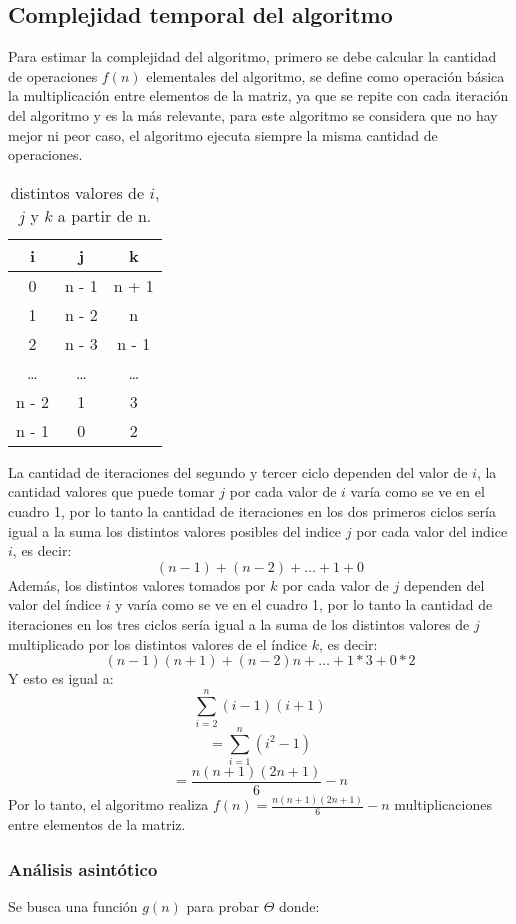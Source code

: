 \documentclass[11pt]{article}
\begin{document}
\subsection{Complejidad temporal del algoritmo}
Para estimar la complejidad del algoritmo, primero se debe calcular la cantidad de operaciones \(f(n)\) elementales del algoritmo, se define como operación básica la multiplicación entre elementos de la matriz, ya que se repite con cada iteración del algoritmo y es la más relevante, para este algoritmo se considera que no hay mejor ni peor caso, el algoritmo ejecuta siempre la misma cantidad de operaciones. 

\begin{table}[h!]
\centering
\begin{tabular}{||c c c||}
\hline 
\textbf{i}  &\textbf{j} & \textbf{k} \\[0.5ex] \hline\hline
0  & n - 1 & n + 1\\ \hline 
1  & n - 2 & n \\ \hline 
2 & n - 3 & n - 1 \\ \hline 
\dots  & \dots & \dots \\ \hline 
n - 2  &1 & 3 \\ \hline 
n - 1  &0 & 2 \\ \hline 
\end{tabular} 
\caption{distintos valores de \(i\),\(j\) y \(k\) a partir de n.}

\end{table}

La cantidad de iteraciones del segundo y tercer ciclo dependen del valor de \(i\), la cantidad valores que puede tomar \(j\) por cada valor de \(i\) varía como se ve en el cuadro 1, por lo tanto la cantidad de iteraciones en los dos primeros ciclos sería igual a la suma los distintos valores posibles del indice \(j\) por cada valor del indice \(i\), es decir: \[(n-1)+(n-2)+ \dots +1+0\]
Además, los distintos valores tomados por \(k\) por cada valor de \(j\) dependen del valor del índice \(i\) y varía como se ve en el cuadro 1, por lo tanto la cantidad de iteraciones en los tres ciclos sería igual a la suma de los distintos valores de \(j\) multiplicado por los distintos valores de el índice \(k\), es decir: \[(n-1)(n+1)+(n-2)n+ \dots +1*3+0*2\]
Y esto es igual a:
\[\sum_{i=2}^{n}  (i-1)(i+1)\]
\[= \sum_{i=1}^{n}  (i^2-1)\]
\[= \frac{n(n+1)(2n+1)}{6} - n\]
Por lo tanto, el algoritmo realiza \(f(n) = \frac{n(n+1)(2n+1)}{6} - n \) multiplicaciones entre elementos de la matriz.
\subsubsection{Análisis asintótico}
Se busca una función \(g(n)\) para probar $\Theta$ donde:\\
\end{document}
